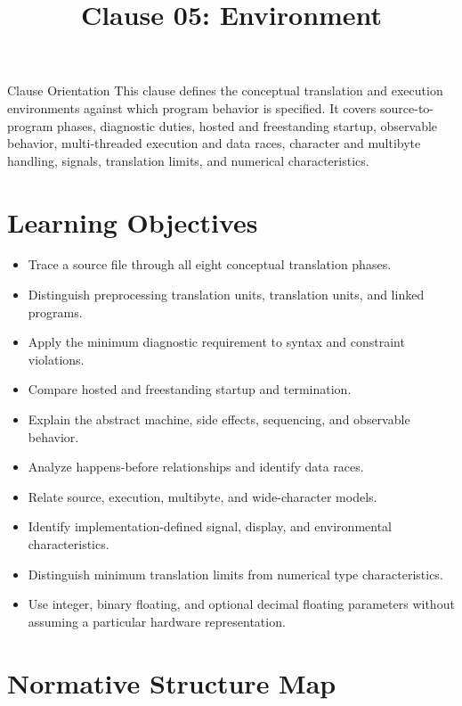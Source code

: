\documentclass[10pt,letterpaper]{article}
\title{Clause 05: Environment}
\author{}
\date{}
\begin{document}
\maketitle



\begin{CornellOverviewBox}{Clause Orientation}
This clause defines the conceptual translation and execution environments against which program behavior is specified. It covers source-to-program phases, diagnostic duties, hosted and freestanding startup, observable behavior, multi-threaded execution and data races, character and multibyte handling, signals, translation limits, and numerical characteristics.
\end{CornellOverviewBox}

\section{Learning Objectives}
\begin{itemize}
  \item Trace a source file through all eight conceptual translation phases.
  \item Distinguish preprocessing translation units, translation units, and linked programs.
  \item Apply the minimum diagnostic requirement to syntax and constraint violations.
  \item Compare hosted and freestanding startup and termination.
  \item Explain the abstract machine, side effects, sequencing, and observable behavior.
  \item Analyze happens-before relationships and identify data races.
  \item Relate source, execution, multibyte, and wide-character models.
  \item Identify implementation-defined signal, display, and environmental characteristics.
  \item Distinguish minimum translation limits from numerical type characteristics.
  \item Use integer, binary floating, and optional decimal floating parameters without assuming a particular hardware representation.
\end{itemize}

\section{Normative Structure Map}
\begin{CornellNotesTable}
\end{CornellNotesTable}
\end{document}
